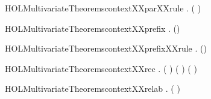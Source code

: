 \newcommand{\HOLMultivariateTheoremscontextXXpar}{\UseVerbatim{HOLMultivariateTheoremscontextXXpar}}
\begin{SaveVerbatim}{HOLMultivariateTheoremscontextXXparXXrule}
\HOLTokenTurnstile{} \HOLSymConst{\HOLTokenForall{}}  .
          \HOLSymConst{\HOLTokenConj{}}    \HOLSymConst{\HOLTokenImp{}}   ( \HOLSymConst{\ensuremath{\parallel}} )
\end{SaveVerbatim}
\newcommand{\HOLMultivariateTheoremscontextXXparXXrule}{\UseVerbatim{HOLMultivariateTheoremscontextXXparXXrule}}
\begin{SaveVerbatim}{HOLMultivariateTheoremscontextXXprefix}
\HOLTokenTurnstile{} \HOLSymConst{\HOLTokenForall{}}  .   () \HOLSymConst{\HOLTokenImp{}}   
\end{SaveVerbatim}
\newcommand{\HOLMultivariateTheoremscontextXXprefix}{\UseVerbatim{HOLMultivariateTheoremscontextXXprefix}}
\begin{SaveVerbatim}{HOLMultivariateTheoremscontextXXprefixXXrule}
\HOLTokenTurnstile{} \HOLSymConst{\HOLTokenForall{}}  .    \HOLSymConst{\HOLTokenImp{}}   ()
\end{SaveVerbatim}
\newcommand{\HOLMultivariateTheoremscontextXXprefixXXrule}{\UseVerbatim{HOLMultivariateTheoremscontextXXprefixXXrule}}
\begin{SaveVerbatim}{HOLMultivariateTheoremscontextXXrec}
\HOLTokenTurnstile{} \HOLSymConst{\HOLTokenForall{}}  .
         (  ) \HOLSymConst{\HOLTokenImp{}}
        ( ) ( ) \HOLSymConst{\HOLTokenConj{}}   
\end{SaveVerbatim}
\newcommand{\HOLMultivariateTheoremscontextXXrec}{\UseVerbatim{HOLMultivariateTheoremscontextXXrec}}
\begin{SaveVerbatim}{HOLMultivariateTheoremscontextXXrelab}
\HOLTokenTurnstile{} \HOLSymConst{\HOLTokenForall{}}  .   (  ) \HOLSymConst{\HOLTokenImp{}}   
\end{SaveVerbatim}

